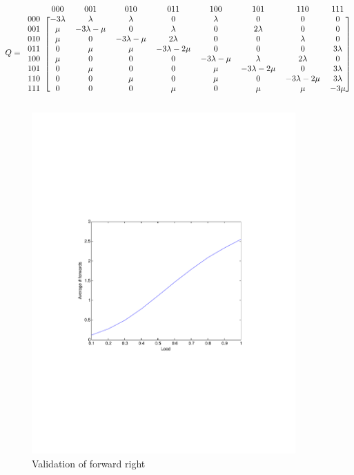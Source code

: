 \documentclass[10pt,a4paper]{article}
\begin{document}
\[ Q =
  \begin{blockarray}{ccccccccc}
    & 000 & 001 & 010 & 011 & 100 & 101 & 110 & 111 \\
    \begin{block}{c[cccccccc]}
    000 & -3 \lambda & \lambda & \lambda & 0 & \lambda & 0 & 0 & 0 \\
    001 & \mu & -3\lambda-\mu & 0 & \lambda & 0 & 2\lambda & 0 & 0 \\
    010 & \mu & 0 & -3\lambda-\mu & 2\lambda & 0 & 0 & \lambda & 0 \\
    011 & 0 & \mu & \mu & -3\lambda-2\mu & 0 & 0 & 0 & 3\lambda \\
    100 & \mu & 0 & 0 & 0 & -3\lambda-\mu & \lambda & 2\lambda & 0 \\
    101 & 0 & \mu & 0 & 0 & \mu & -3\lambda-2\mu & 0 & 3\lambda \\
    110 & 0 & 0 & \mu & 0 & \mu & 0 & -3\lambda-2\mu & 3\lambda \\
    111 & 0 & 0 & 0 & \mu & 0 & \mu & \mu & -3\mu \\
    \end{block}
  \end{blockarray}
\]

\begin{figure}[h!tb]
\centering
\includegraphics[clip=true, trim=9em 24em 9em 24em, width=0.9\textwidth]{resources/plotright.pdf}
\caption{Validation of forward right}
\label{validright}
\end{figure}
\end{document}
